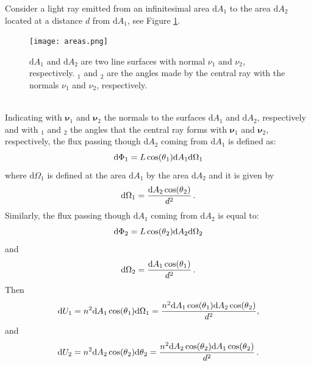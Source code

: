 Consider a light ray emitted from an infinitesimal area $\textrm{d}A_1$ to the area $\textrm{d}A_2$ located at a distance $d$ from $\textrm{d}A_1$,  see Figure \ref{fig:etendue_conservation}.
\begin{figure}[h]
 \label{fig:etendue_conservation}
     \begin{center}
     \texttt{[image: areas.png]}
     \end{center}
     \caption{\footnotesize{$\textrm{d}A_1$ and $\textrm{d}A_2$ are two line surfaces with normal $\nu_1$ and $\nu_2$, respectively. \myangle$_1$ and \myangle$_2$ are the angles made by the central ray with the normals $\nu_1$ and $\nu_2$, respectively.}}
\label{fig:etendue_conservation}
 \end{figure}
\\ Indicating with $\boldsymbol{\nu}_1$ and $\boldsymbol{\nu}_2$ the normals to the surfaces $\textrm{d}A_1$ and $\textrm{d}A_2$, respectively and with \myangle$_1$ and \myangle$_2$ the angles that the central ray forms with $\boldsymbol{\nu}_1$ and $\boldsymbol{\nu}_2$, respectively,
the flux passing though $\textrm{d}A_2$ coming from $\textrm{d}A_1$ is defined as:
\begin{equation}
\textrm{d}\Phi_1 = L \cos(\mbox{$\theta$}_1) \textrm{d}A_1 \textrm{d}\Omega_1
\end{equation}
where $\textrm{d}\Omega_1$ is defined at the area $\textrm{d}A_1$ by the area $\textrm{d}A_2$ and it is given by 
\begin{equation}
\textrm{d}\Omega_1 = \frac{\textrm{d}A_2\cos(\mbox{$\theta$}_2)}{d^2}\,.
\end{equation}
Similarly, the flux passing though $\textrm{d}A_1$ coming from $\textrm{d}A_2$ is equal to:
\begin{equation}
\textrm{d}\Phi_2 = L \cos(\mbox{$\theta$}_2) \textrm{d}A_2 \textrm{d}\Omega_2
\end{equation}
and
\begin{equation}
\textrm{d}\Omega_2 = \frac{\textrm{d}A_1\cos(\mbox{$\theta$}_1)}{d^2}\,.
\end{equation}
Then \begin{equation}
\label{etendue1}
\textrm{d}U_1 = n^2 \textrm{d}A_1\cos(\mbox{$\theta$}_1)\textrm{d}\Omega_1= \frac{n^2 \textrm{d}A_1\cos(\mbox{$\theta$}_1)\textrm{d}A_2\cos(\mbox{$\theta$}_2)}{d^2},
\end{equation}
and
\begin{equation}
\label{etendue2}
\textrm{d}U_2 = n^2 \textrm{d}A_2\cos(\mbox{$\theta$}_2)\textrm{d}\mbox{$\theta$}_2= \frac{ n^2 \textrm{d}A_2\cos(\mbox{$\theta$}_2)\textrm{d}A_1\cos(\mbox{$\theta$}_2)}{d^2}\,.
\end{equation}
